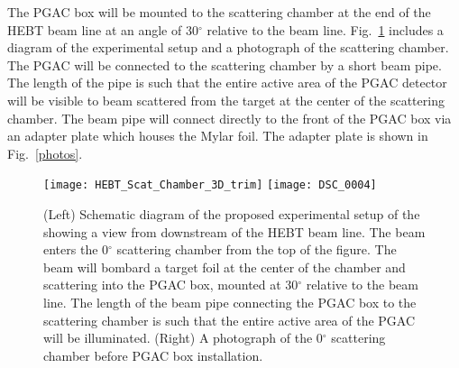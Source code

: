 The PGAC box will be mounted to the scattering chamber at the end of the HEBT beam line at an angle of 30$^\circ$ relative to the beam line.  Fig.~\ref{schematic} includes a diagram of the experimental setup and a photograph of the scattering chamber.  The PGAC will be connected to the scattering chamber by a short beam pipe.  The length of the pipe is such that the 
entire active area of the PGAC detector will be visible to beam scattered from the target
 at the center of the scattering chamber. The beam pipe will connect directly to the front of the PGAC box via an adapter plate which houses the Mylar foil. The adapter plate is shown in Fig.~\ref{photos}.

\begin{figure}[t]
\centering
\texttt{[image: HEBT\_Scat\_Chamber\_3D\_trim]}\hspace{\fill}
\texttt{[image: DSC\_0004]} \hspace{\fill}
\caption{(Left) Schematic diagram of the proposed experimental setup of the 
showing a view from downstream of the HEBT beam line.  The beam enters the 0$^\circ$ scattering chamber from the top of the figure.  The beam will bombard a target foil at the center of the chamber and scattering into the PGAC box, mounted at 30$^\circ$ relative to the beam line.  The length of the beam pipe connecting the PGAC box to the scattering chamber is such that the entire active area of the PGAC will be illuminated.  (Right) A photograph of the 0$^\circ$ scattering chamber before PGAC box installation.
}
\label{schematic}
\end{figure}
